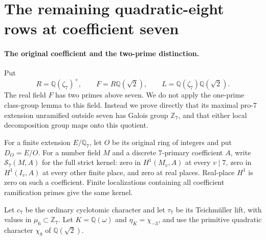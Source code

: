 \section{The remaining quadratic-eight rows at coefficient seven}
\label{sec:coefficient-seven-two-prime-procyclic}

\paragraph{The original coefficient and the two-prime distinction.}
Put
\[
 R=\mathbb Q(\zeta_7)^+,
 \qquad F=R\mathbb Q(\sqrt2),
 \qquad L=\mathbb Q(\zeta_7)\mathbb Q(\sqrt2).
 \tag{RP7.1}
\]
The real field $F$ has two primes above seven. We do not apply
the one-prime class-group lemma to this field. Instead we prove
directly that its maximal pro-$7$ extension unramified outside seven
has Galois group $\mathbb Z_7$, and that either local
decomposition group maps onto this quotient.

For a finite extension $E/\mathbb Q_7$, let $O$ be its original
ring of integers and put $D_O=E/O$. For a number field $M$ and
a discrete $7$-primary coefficient $A$, write $\mathcal S_7(M,A)$
for the full strict kernel: zero in $H^1(M_v,A)$ at every
$v\mid7$, zero in $H^1(I_v,A)$ at every other finite place,
and zero at real places. Real-place $H^1$ is zero on such a
coefficient. Finite localizations containing all coefficient
ramification primes give the same kernel.

Let $c_7$ be the ordinary cyclotomic character and let $\tau_7$
be its Teichm\"uller lift, with values in $\mu_6\subset\mathbb Z_7$.
Let $K=\mathbb Q(\omega)$ and $\eta_K=\chi_{-3}$, and use the
primitive quadratic character $\chi_8$ of $\mathbb Q(\sqrt2)$.

